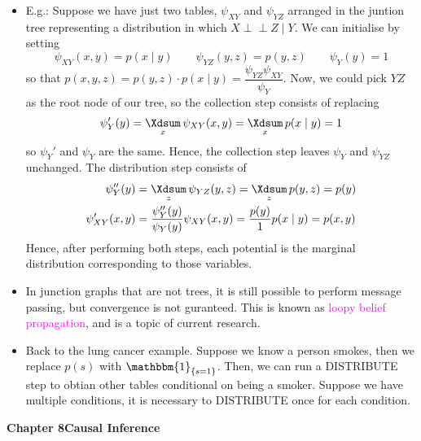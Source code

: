 \documentclass[UTF8]{book}
\DeclareMathOperator*{\Xsum}{\mathchoice{\Xdsum}{\Xtsum}{\Xtsum}{\Xtsum}}
\newcommand{\perpp}{\ensuremath{\perp\!\!\!\!\!\perp}}
\newcommand{\et}{&}
\newcommand{\concept}[1]{\textcolor{magenta}{#1}}
\begin{document}
\begin{itemize}
\item E.g.: Suppose we have just two tables, $\psi_{XY}$ and $\psi_{YZ}$ arranged in the juntion tree representing a distribution in which $X\perpp Z\mid Y$. We can initialise by setting
$$
\psi_{XY}(x,y) = p(x\mid y) \qquad \psi_{YZ}(y,z) = p(y, z) \qquad \psi_Y(y) = 1
$$
so that $p(x,y,z) = p(y,z)\cdot p(x\mid y)=\dfrac{\psi_{YZ}\psi_{XY}}{\psi_Y}$. Now, we could pick $YZ$ as the root node of our tree, so the collection step consists of replacing 
$$
\psi_Y'(y) = \Xsum_x\psi_{XY}(x,y) = \Xsum_xp(x\mid y) = 1
$$
so $\psi_Y'$ and $\psi_Y$ are the same. Hence, the collection step leaves $\psi_Y$ and $\psi_{YZ}$ unchanged. The distribution step consists of 
\begin{align*}
	\psi_Y''(y) \et = \Xsum_z\psi_{YZ}(y,z) = \Xsum_zp(y,z) = p(y)\\
	\psi_{XY}'(x,y) \et = \dfrac{\psi_Y''(y)}{\psi_Y(y)}\psi_{XY}(x,y) = \dfrac{p(y)}{1}p(x\mid y) = p(x,y)
\end{align*}
Hence, after performing both steps, each potential is the marginal distribution corresponding to those variables.
\item In junction graphs that are not trees, it is still possible to perform message passing, but convergence is not guranteed. This is known as \concept{loopy belief propagation}, and is a topic of current research.
\item Back to the lung cancer example. Suppose we know a person smokes, then we replace $p(s)$ with $\mathbbm{1}_{\{s=1\}}$. Then, we can run a DISTRIBUTE step to obtian other tables conditional on being a smoker. Suppose we have multiple conditions, it is necessary to DISTRIBUTE once for each condition.
\end{itemize}
\large{\textbf{Chapter 8\quad Causal Inference}}
\end{document}
